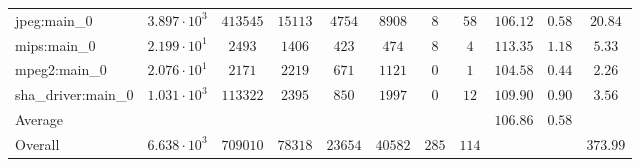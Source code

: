 \begin{tabular}{|l|c|c|c|c|c|c|c|c|c|c|}
jpeg:main\_0            & $ 3.897 \cdot 10^{3}  $ & $ 413545 $ & $ 15113 $ & $ 4754  $ & $ 8908  $ & $ 8   $ & $ 58  $ & $ 106.12      $ & $ 0.58    $ & $ 20.84   $ \\
mips:main\_0            & $ 2.199 \cdot 10^{1}  $ & $ 2493   $ & $ 1406  $ & $ 423   $ & $ 474   $ & $ 8   $ & $ 4   $ & $ 113.35      $ & $ 1.18    $ & $ 5.33    $ \\
mpeg2:main\_0           & $ 2.076 \cdot 10^{1}  $ & $ 2171   $ & $ 2219  $ & $ 671   $ & $ 1121  $ & $ 0   $ & $ 1   $ & $ 104.58      $ & $ 0.44    $ & $ 2.26    $ \\
sha\_driver:main\_0     & $ 1.031 \cdot 10^{3}  $ & $ 113322 $ & $ 2395  $ & $ 850   $ & $ 1997  $ & $ 0   $ & $ 12  $ & $ 109.90      $ & $ 0.90    $ & $ 3.56    $ \\
\hline
Average                 & $                     $ & $        $ & $       $ & $       $ & $       $ & $     $ & $     $ & $ 106.86      $ & $ 0.58    $ & $         $ \\
\hline
Overall                 & $ 6.638 \cdot 10^{3}  $ & $ 709010 $ & $ 78318 $ & $ 23654 $ & $ 40582 $ & $ 285 $ & $ 114 $ & $             $ & $         $ & $ 373.99  $ \\
\hline
\end{tabular}
